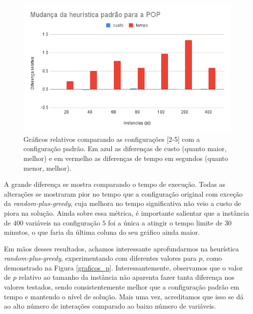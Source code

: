 \documentclass[11pt]{article}
\begin{document}
\begin{figure}
\begin{multicols}{2}
    \includegraphics[width=\linewidth]{pop.png}\par
\end{multicols}
\caption{Gráficos relativos comparando as configurações [2-5] com a configuração padrão. Em azul as diferenças de custo (quanto maior, melhor) e em vermelho as diferenças de tempo em segundos (quanto menor, melhor).}
\label{graficos}
\end{figure}

A grande diferença se mostra comparando o tempo de execução. Todas as alterações se mostraram pior no tempo que a configuração original com exceção da \emph{random-plus-greedy}, cuja melhora no tempo significativa não veio a custo de piora na solução. Ainda sobre essa métrica, é importante salientar que a instância de \(400\) variáveis na configuração \(5\) foi a única a atingir o tempo limite de \(30\) minutos, o que faria da última coluna do seu gráfico ainda maior.


Em mãos desses resultados, achamos interessante aprofundarmos na heurística \emph{random-plus-greedy}, experimentando com diferentes valores para \(p\), como demonstrado na Figura \ref{graficos_p}. Interessantemente, observamos que o valor de \(p\) relativo ao tamanho da instância não aparenta fazer tanta diferença nos valores testados, sendo consistentemente melhor que a configuração padrão em tempo e mantendo o nível de solução. Mais uma vez, acreditamos que isso se dá ao alto número de interações comparado ao baixo número de variáveis.
\end{document}
